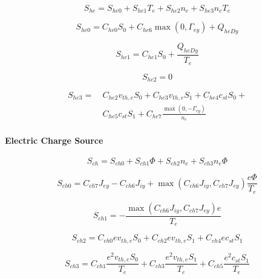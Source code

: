 \documentclass[a4paper,10pt]{report}
\begin{document}
\begin{equation}
S_{he}=S_{he0}+S_{he1}T_{e}+S_{he2}n_{e}+S_{he3}n_{e}T_e   \label{34}
\end{equation}

\begin{equation}
S_{he0}=C_{he0}S_{0}+C_{he6}\max\left( 0,\Gamma_{ey}\right) +Q_{heDy}
\label{35}
\end{equation}

\begin{equation}
S_{he1}=C_{he1}S_{0}+\frac{Q_{heDy}}{T_{e}}   \label{36}
\end{equation}

\begin{equation}
S_{he2}=0   \label{37}
\end{equation}

\begin{equation}\begin{split}
S_{he3}= ~ & C_{he2}v_{th,e}S_{0}+C_{he3}v_{th,e}S_{1}+C_{he4}c_{st}S_{0}+ \\
~ & C_{he5}c_{st}S_{1}+C_{he7}\frac{\max\left( 0,-\Gamma_{ey}\right) }{n_{e}}
\label{38}
\end{split}\end{equation}

\paragraph{Electric Charge Source}

\begin{equation}
S_{ch}=S_{ch0}+S_{ch1}\Phi+S_{ch2}n_{e}+S_{ch3}n_{e}\Phi   \label{39}
\end{equation}

\begin{equation}
S_{ch0}=C_{ch7}J_{ey}-C_{ch6}J_{iy}+
\max\left(C_{ch6}J_{iy},C_{ch7}J_{ey}\right) \frac{e\Phi}{T_{e}}   \label{40}
\end{equation}
\bigskip

\begin{equation}
S_{ch1}=-\frac{\max\left( C_{ch6}J_{iy},C_{ch7}J_{ey}\right) e}{T_e}   \label{41}
\end{equation}

\begin{equation}
S_{ch2}=C_{ch0}ev_{th,e}S_{0}+C_{ch2}ev_{th,e}S_{1}+C_{ch4}ec_{st}S_{1}
\label{42}
\end{equation}

\begin{equation}
S_{ch3}=C_{ch1}\frac{e^{2}v_{th,e}S_{0}}{T_{e}}+C_{ch3}
\frac{e^{2}v_{th,e}S_{1}}{T_{e}}+C_{ch5}\frac{e^{2}c_{st}S_{1}}{T_{e}}   \label{43}
\end{equation}
\end{document}

